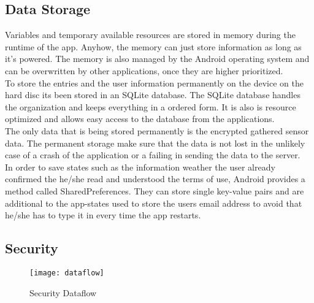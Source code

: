 \subsection{Data Storage}
Variables and temporary available resources are stored in memory during the runtime of the app. Anyhow, the memory can just store information as long as it's powered. The memory is also managed by the Android operating system and can be overwritten by other applications, once they are higher prioritized.\\
To store the entries and the user information permanently on the device on the hard disc its been stored in an SQLite database. The SQLite database handles the organization and keeps everything in a ordered form. It is also is resource optimized and allows easy access to the database from the applications.\\
The only data that is being stored permanently is the encrypted gathered sensor data. The permanent storage make sure that the data is not lost in the unlikely case of a crash of the application or a failing in sending the data to the server.\\
In order to save states such as the information weather the user already confirmed the he/she read and understood the terms of use, Android provides a method called SharedPreferences. They can store single key-value pairs and are additional to the app-states used to store the users email address to avoid that he/she has to type it in every time the app restarts. 

\subsection{Security}
\begin{figure}
\texttt{[image: dataflow]}
\caption{Security Dataflow}\label{security}
 	\vspace{10 mm}
\end{figure}

